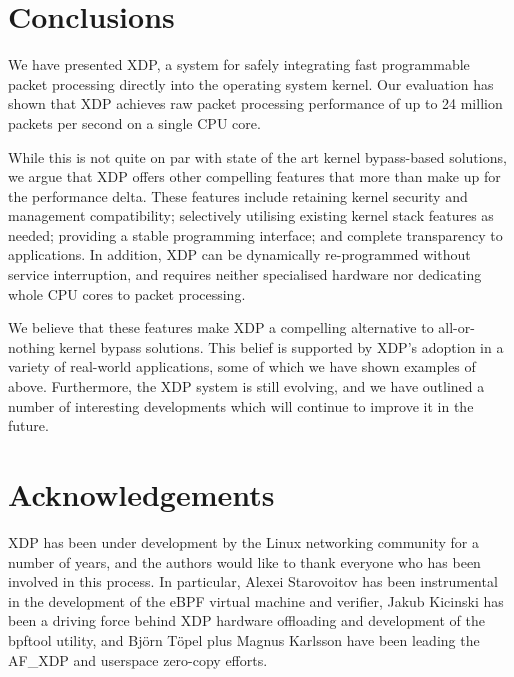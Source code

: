 \documentclass[sigconf]{acmart}
\begin{document}
\section{Conclusions}
\label{sec:conclusion}
We have presented XDP, a system for safely integrating fast programmable packet
processing directly into the operating system kernel. Our evaluation has shown
that XDP achieves raw packet processing performance of up to 24 million packets
per second on a single CPU core.

While this is not quite on par with state of the art kernel bypass-based
solutions, we argue that XDP offers other compelling features that more than
make up for the performance delta. These features include retaining kernel
security and management compatibility; selectively utilising existing kernel
stack features as needed; providing a stable programming interface; and complete
transparency to applications. In addition, XDP can be dynamically re-programmed
without service interruption, and requires neither specialised hardware nor
dedicating whole CPU cores to packet processing.

We believe that these features make XDP a compelling alternative to
all-or-nothing kernel bypass solutions. This belief is supported by XDP's
adoption in a variety of real-world applications, some of which we have shown
examples of above. Furthermore, the XDP system is still evolving, and we have
outlined a number of interesting developments which will continue to improve it
in the future.

\section*{Acknowledgements}
\label{sec:acknowledgements}
XDP has been under development by the Linux networking community for a number of
years, and the authors would like to thank everyone who has been involved in
this process. In particular, Alexei Starovoitov has been instrumental in the
development of the eBPF virtual machine and verifier, Jakub Kicinski has been a
driving force behind XDP hardware offloading and development of the bpftool
utility, and Björn Töpel plus Magnus Karlsson have been leading the AF\_XDP and
userspace zero-copy efforts.




\end{document}
